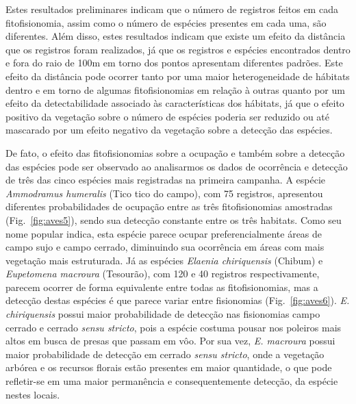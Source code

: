 Estes resultados preliminares indicam que o número de registros feitos
em cada fitofisionomia, assim como o número de espécies presentes em
cada uma, são diferentes. Além disso, estes resultados indicam que
existe um efeito da distância que os registros foram realizados, já
que os registros e espécies encontrados dentro e fora do raio de 100m
em torno dos pontos apresentam diferentes padrões. Este efeito da
distância pode ocorrer tanto por uma maior heterogeneidade de hábitats
dentro e em torno de algumas fitofisionomias em relação à outras quanto por um
efeito da detectabilidade associado às características dos hábitats,
já que o efeito positivo da vegetação sobre o número de espécies
poderia ser reduzido ou até mascarado por um efeito negativo da
vegetação sobre a detecção das espécies.

De fato, o efeito das fitofisionomias sobre a ocupação e também sobre a detecção das espécies pode ser observado ao analisarmos os dados de ocorrência e detecção de três das cinco espécies mais registradas na primeira campanha. A espécie \textit{Ammodramus humeralis} (Tico tico do campo), com 75 registros, apresentou diferentes probabilidades de ocupação entre as três fitofisionomias amostradas (Fig.~\ref{fig:aves5}), sendo sua detecção constante entre os três habitats. Como seu nome popular indica, esta espécie parece ocupar preferencialmente áreas de campo sujo e campo cerrado, diminuindo sua ocorrência em áreas com mais vegetação mais estruturada. Já as espécies \textit{Elaenia chiriquensis} (Chibum) e \textit{Eupetomena macroura} (Tesourão), com 120 e 40 registros respectivamente, parecem ocorrer de forma equivalente entre todas as fitofisionomias, mas a detecção destas espécies é que parece variar entre fisionomias (Fig.~\ref{fig:aves6}). \textit{E. chiriquensis} possui maior probabilidade de detecção nas fisionomias campo cerrado e cerrado \textit{sensu stricto}, pois a espécie costuma pousar nos poleiros mais altos em busca de presas que passam em vôo. Por sua vez, \textit{E. macroura} possui maior probabilidade de detecção em cerrado \textit{sensu stricto}, onde a vegetação arbórea e os recursos florais estão presentes em maior quantidade, o que pode refletir-se em uma maior permanência e consequentemente detecção, da espécie nestes locais.


